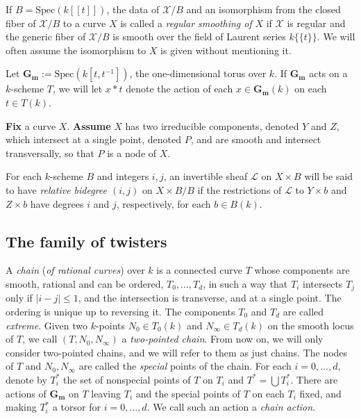 \documentclass[a4paper,11pt]{amsart}
\theoremstyle{plain}
\theoremstyle{definition}
\theoremstyle{remark}
\def\cc{{\mathbf G}_{\mathbf m}}
\begin{document}
If $B=\text{Spec}(k[[t]])$, the data of $\mathcal{X}/B$ and an isomorphism from the closed fiber of $\mathcal{X}/B$ to a curve $X$ is called a {\it regular smoothing of} $X$ if $\mathcal{X}$ is regular and the generic fiber of $\mathcal{X}/B$ is smooth over the field of Laurent series $k\{\{t\}\}$. We will often assume the isomorphism to $X$ is given without mentioning it.

Let ${\mathbf G}_{\mathbf m}:=\text{Spec}(k[t,t^{-1}])$, the one-dimensional torus over $k$. If ${\mathbf G}_{\mathbf m}$ acts on a $k$-scheme $T$, we will let $x\ast t$ denote the action of each $x\in{\mathbf G}_{\mathbf m}(k)$ on 
each $t\in T(k)$.

\textbf{Fix} a curve $X$. \textbf{Assume} $X$ has two irreducible components, denoted $Y$ and $Z$, which intersect at a single point, denoted $P$, and are smooth and intersect transversally, so that $P$ is a node of $X$.

For each $k$-scheme $B$ and integers $i,j$, an invertible sheaf $\mathcal L$ on $X\times B$ will be said to have \emph{relative bidegree $(i,j)$} on $X\times B/B$ if the restrictions of $\mathcal L$ to $Y\times b$ and $Z\times b$ have degrees $i$ and $j$, respectively, for each $b\in B(k)$. 

\subsection{The family of twisters}\label{sec:twisters}

A \emph{chain} (\emph{of rational curves}) over $k$ is a connected curve $T$ whose components are smooth, rational and can be ordered, $T_0,\dots,T_d$, in such a way that $T_i$ intersects $T_j$ only if $|i-j|\leq 1$, and the intersection is transverse, and at a single point. The ordering is unique up to reversing it. The components $T_0$ and $T_d$ are called \emph{extreme}. Given two $k$-points $N_0\in T_0(k)$ and $N_\infty\in T_d(k)$ on the smooth locus of $T$, we call $(T,N_0,N_\infty)$ a \emph{two-pointed chain}. From now on, we will only consider two-pointed chains, and we will refer to them as just chains. The nodes of $T$ and $N_0,N_{\infty}$ are called the \emph{special} points of the chain. For each $i=0,\dots,d$, denote by $T^*_i$ the set of nonspecial points of $T$ on $T_i$ and $T^*=\bigcup T_i^*$. There are actions of $\cc$ on $T$ leaving $T_i$ and the special points of $T$ on each $T_i$ fixed, and making $T_i^*$ a torsor for $i=0,\dots,d$. We call such an action a \emph{chain action}.
\end{document}
